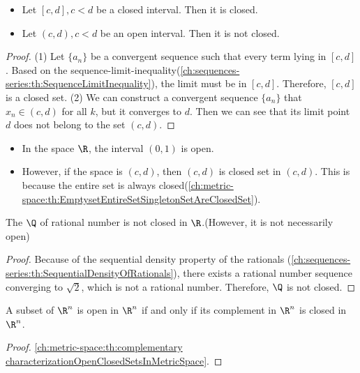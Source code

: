 \begin{refsection}
\begin{lemma}\cite[37]{fitzpatrick2006advanced}
\begin{itemize}
	\item Let $[c,d], c < d$ be a closed interval. Then it is closed.
	\item Let $(c,d),c < d$ be an open interval. Then it is not closed. 
\end{itemize}	
\end{lemma}
\begin{proof}
(1)	
Let $\{a_n\}$ be a convergent sequence such that every term lying in $[c,d]$. Based on the sequence-limit-inequality(\autoref{ch:sequences-series:th:SequenceLimitInequality}),  the limit must be in $[c,d]$. Therefore, $[c,d]$ is a closed set.
(2) We can construct a convergent sequence $\{a_n\}$ that $x_n \in (c,d)$ for all $k$, but it converges to $d$. Then we can see that its limit point $d$ does not belong to the set $(c,d)$.  
\end{proof}

\begin{note}\hfill
\begin{itemize}
	\item In the space $\R$, the interval $(0,1)$ is open.
	\item However, if the space is $(c,d)$, then $(c,d)$ is closed set in $(c,d)$. This is because the entire set is always closed(\autoref{ch:metric-space:th:EmptysetEntireSetSingletonSetAreClosedSet}). 
\end{itemize}	
\end{note}

\begin{lemma}\cite[37]{fitzpatrick2006advanced}
The $\Q$ of rational number is not closed in $\R$.(However, it is not necessarily open)	
\end{lemma}
\begin{proof}
Because of the sequential density property of the rationals (\autoref{ch:sequences-series:th:SequentialDensityOfRationals}), there exists a rational number sequence converging to $\sqrt{2}$, which is not a rational number. Therefore, $\Q$ is not closed.	
\end{proof}

\begin{theorem}\cite[285]{fitzpatrick2006advanced}
A subset of $\R^n$ is open in $\R^n$ if and only if its complement in $\R^n$ is closed in $\R^n$.	
\end{theorem}
\begin{proof}
\autoref{ch:metric-space:th:complementary characterizationOpenClosedSetsInMetricSpace}.
\end{proof}


\end{refsection}
